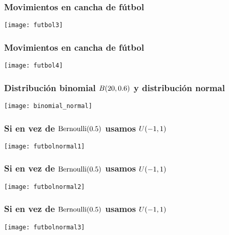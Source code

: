 \documentclass[table]{beamer}
\begin{document}
\begin{frame}
    \frametitle{Movimientos en cancha de fútbol}
    \begin{center}
        \texttt{[image: futbol3]}
    \end{center}
\end{frame}

\begin{frame}
    \frametitle{Movimientos en cancha de fútbol}
    \begin{center}
        \texttt{[image: futbol4]}
    \end{center}
\end{frame}
\fi


\iffalse
\begin{frame}
    \frametitle{Distribución binomial $\binomial{20}{0.6}$ y distribución normal}
    \begin{center}
        \texttt{[image: binomial\_normal]}
    \end{center}
\end{frame}

\begin{frame}
    \frametitle{Si en vez de $\bernoulli{0.5}$ usamos $\uniform{-1}{1}$}
    \begin{center}
        \texttt{[image: futbolnormal1]}
    \end{center}
\end{frame}

\begin{frame}
    \frametitle{Si en vez de $\bernoulli{0.5}$ usamos $\uniform{-1}{1}$}
    \begin{center}
        \texttt{[image: futbolnormal2]}
    \end{center}
\end{frame}

\begin{frame}
    \frametitle{Si en vez de $\bernoulli{0.5}$ usamos $\uniform{-1}{1}$}
    \begin{center}
        \texttt{[image: futbolnormal3]}
    \end{center}
\end{frame}
\end{document}
